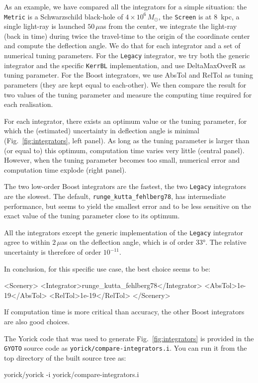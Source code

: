 \documentclass[a4paper,12pt]{article}
\begin{document}
As an example, we have compared all the integrators for a simple
situation: the \texttt{Metric} is a Schwarzschild black-hole of
$4\times10^6\,M_\odot$, the \texttt{Screen} is at 8~kpc, a single
light-ray is launched $50\,\mu$as from the center, we integrate the
light-ray (back in time) during twice the travel-time to the origin of
the coordinate center and compute the deflection angle. We do that for
each integrator and a set of numerical tuning parameters. For the
\texttt{Legacy} integrator, we try both the generic integrator and the
specific \texttt{KerrBL} implementation, and use DeltaMaxOverR as
tuning parameter. For the Boost integrators, we use AbsTol and RelTol
as tuning parameters (they are kept equal to each-other). We then
compare the result for two values of the tuning parameter and measure
the computing time required for each
realisation.

For each integrator, there exists an optimum value or the tuning
parameter, for which the (estimated) uncertainty in deflection angle
is minimal (Fig.~\ref{fig:integrators}, left panel). As long as the
tuning parameter is larger than (or equal to) this optimum,
computation time varies very little (central panel). However, when the
tuning parameter becomes too small, numerical error and computation
time explode (right panel).

The two low-order Boost integrators are the fastest, the two
\texttt{Legacy} integrators are the slowest. The default,
\texttt{runge\_kutta\_fehlberg78}, has intermediate performance, but
seems to yield the smallest error and to be less sensitive on the
exact value of the tuning parameter close to its optimum.

All the integrators except the generic implementation of the
\texttt{Legacy} integrator agree to within $2\,\mu$as on the
deflection angle, which is of order 33°. The relative uncertainty is
therefore of order $10^{-11}$.

In conclusion, for this specific use case, the best choice seems to be:
\begin{code}
<Scenery>
 <Integrator>runge_kutta_fehlberg78</Integrator>
 <AbsTol>1e-19</AbsTol>
 <RelTol>1e-19</RelTol>
</Scenery>
\end{code}
If computation time is more critical than accuracy, the other Boost
integrators are also good choices.

The Yorick code that was used to generate Fig.~\ref{fig:integrators}
is provided in the \texttt{GYOTO} source code as
\texttt{yorick/compare-integrators.i}. You can run it from the top
directory of the built source tree as:
\begin{code}
  yorick/yorick -i yorick/compare-integrators.i
\end{code}
\end{document}
